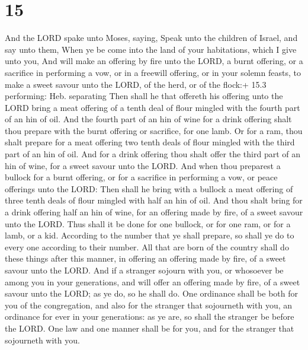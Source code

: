 \hypertarget{section-14}{%
\section{15}\label{section-14}}

 And the LORD spake unto Moses, saying,  Speak
unto the children of Israel, and say unto them, When ye be come into the
land of your habitations, which I give unto you,  And will
make an offering by fire unto the LORD, a burnt offering, or a sacrifice
in performing a vow, or in a freewill offering, or in your solemn
feasts, to make a sweet savour unto the LORD, of the herd, or of the
flock:+ 15.3 performing: Heb. separating  Then shall he that
offereth his offering unto the LORD bring a meat offering of a tenth
deal of flour mingled with the fourth part of an hin of oil.
 And the fourth part of an hin of wine for a drink offering
shalt thou prepare with the burnt offering or sacrifice, for one lamb.
 Or for a ram, thou shalt prepare for a meat offering two
tenth deals of flour mingled with the third part of an hin of oil.
 And for a drink offering thou shalt offer the third part of
an hin of wine, for a sweet savour unto the LORD.  And when
thou preparest a bullock for a burnt offering, or for a sacrifice in
performing a vow, or peace offerings unto the LORD:  Then
shall he bring with a bullock a meat offering of three tenth deals of
flour mingled with half an hin of oil.  And thou shalt
bring for a drink offering half an hin of wine, for an offering made by
fire, of a sweet savour unto the LORD.  Thus shall it be
done for one bullock, or for one ram, or for a lamb, or a kid.
 According to the number that ye shall prepare, so shall ye
do to every one according to their number.  All that are
born of the country shall do these things after this manner, in offering
an offering made by fire, of a sweet savour unto the LORD. 
And if a stranger sojourn with you, or whosoever be among you in your
generations, and will offer an offering made by fire, of a sweet savour
unto the LORD; as ye do, so he shall do.  One ordinance
shall be both for you of the congregation, and also for the stranger
that sojourneth with you, an ordinance for ever in your generations: as
ye are, so shall the stranger be before the LORD.  One law
and one manner shall be for you, and for the stranger that sojourneth
with you.

